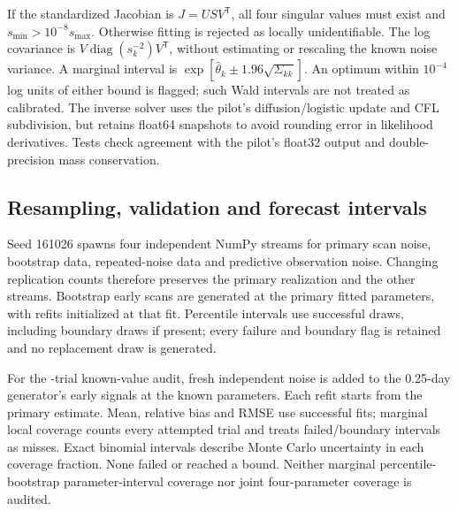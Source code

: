 If the standardized Jacobian is $J=USV^{\mathsf T}$, all four singular values must exist and $s_{\min}>10^{-8}s_{\max}$. Otherwise fitting is rejected as locally unidentifiable. The log covariance is $V\operatorname{diag}(s_k^{-2})V^{\mathsf T}$, without estimating or rescaling the known noise variance. A marginal interval is $\exp[\hat\theta_k\pm1.96\sqrt{\Sigma_{kk}}]$. An optimum within $10^{-4}$ log units of either bound is flagged; such Wald intervals are not treated as calibrated. The inverse solver uses the pilot's diffusion/logistic update and CFL subdivision, but retains float64 snapshots to avoid rounding error in likelihood derivatives. Tests check agreement with the pilot's float32 output and double-precision mass conservation.

\subsection{Resampling, validation and forecast intervals}
Seed 161026 spawns four independent NumPy streams for primary scan noise, bootstrap data, repeated-noise data and predictive observation noise. Changing replication counts therefore preserves the primary realization and the other streams. Bootstrap early scans are generated at the primary fitted parameters, with \PRBootstraps{} refits initialized at that fit. Percentile intervals use successful draws, including boundary draws if present; every failure and boundary flag is retained and no replacement draw is generated.

For the \PRTrials{}-trial known-value audit, fresh independent noise is added to the 0.25-day generator's early signals at the known parameters. Each refit starts from the primary estimate. Mean, relative bias and RMSE use successful fits; marginal local coverage counts every attempted trial and treats failed/boundary intervals as misses. Exact binomial intervals describe Monte Carlo uncertainty in each coverage fraction. None failed or reached a bound. Neither marginal percentile-bootstrap parameter-interval coverage nor joint four-parameter coverage is audited.

